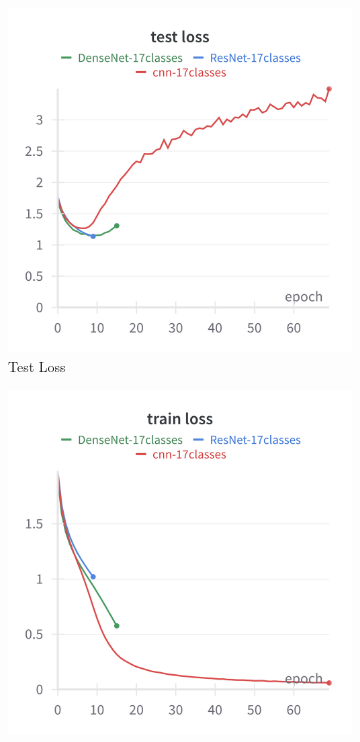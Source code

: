 \documentclass[twocolumn,superscriptaddress,aps]{revtex4-1}
\begin{document}
\begin{figure}[H]
    \centering
    \begin{subfigure}{0.235 \textwidth}
        \includegraphics[width = 0.99 \textwidth]{images/17classes_test.png}
        \caption{Test Loss}
    \end{subfigure}
    \begin{subfigure}{0.235 \textwidth}
        \includegraphics[width = 0.99 \textwidth]{images/17classes_train.png}

\end{subfigure}
\end{figure}
\end{document}
